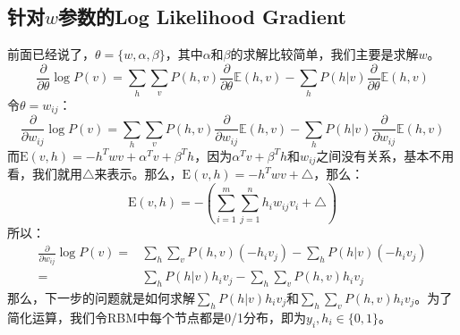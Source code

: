 \documentclass[a4paper]{article}
\begin{document}
\subsection{针对$w$参数的Log Likelihood Gradient}
前面已经说了，$\theta=\{w,\alpha,\beta\}$，其中$\alpha$和$\beta$的求解比较简单，我们主要是求解$w$。
\begin{equation}
    \frac{\partial }{\partial \theta} \log P(v) 
    = \sum_h \sum_v P(h,v) \frac{\partial }{\partial \theta} \mathbb{E}(h,v) - \sum_h P(h|v) \frac{\partial }{\partial \theta} \mathbb{E}(h,v)
\end{equation}
令$\theta = w_{ij}$：
\begin{equation}
    \frac{\partial }{\partial w_{ij}} \log P(v) 
    = \sum_h \sum_v P(h,v) \frac{\partial }{\partial w_{ij}} \mathbb{E}(h,v) - \sum_h P(h|v) \frac{\partial }{\partial w_{ij}} \mathbb{E}(h,v)
\end{equation}
而$\mathrm{E}(v,h) = - h^T w v + \alpha^T v + \beta^T h$，因为$\alpha^T v + \beta^T h$和$w_{ij}$之间没有关系，基本不用看，我们就用$\triangle$来表示。那么，$\mathrm{E}(v,h) = - h^T w v + \triangle$，那么：
$$
 \mathrm{E}(v,h) = - \left( \sum_{i=1}^m \sum_{j=1}^n h_iw_{ij}v_i + \triangle \right)
$$
所以：
\begin{equation}
    \begin{split}
    \frac{\partial }{\partial w_{ij}} \log P(v) 
    = & \sum_h \sum_v P(h,v) (-h_iv_j) - \sum_h P(h|v) (-h_iv_j) \\
    = & \sum_h P(h|v) h_iv_j - \sum_h \sum_v P(h,v)h_iv_j
    \end{split}
\end{equation}
那么，下一步的问题就是如何求解$\sum_h P(h|v)h_iv_j$和$\sum_h \sum_v P(h,v)h_iv_j$。为了简化运算，我们令RBM中每个节点都是0/1分布，即为$y_i,h_i\in \{0,1\}$。
\end{document}
